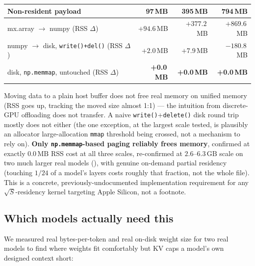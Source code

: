 \documentclass[11pt]{article}
\begin{document}
\begin{center}
\begin{tabular}{@{}lrrr@{}}
\toprule
Non-resident payload & 97\,MB & 395\,MB & 794\,MB \\
\midrule
mx.array $\to$ numpy (RSS $\Delta$) & $+94.6$\,MB & $+377.2$\,MB & $+869.6$\,MB \\
numpy $\to$ disk, \texttt{write()+del()} (RSS $\Delta$) & $+2.0$\,MB & $+7.9$\,MB & $-180.8$\,MB \\
disk, \texttt{np.memmap}, untouched (RSS $\Delta$) & \textbf{+0.0\,MB} & \textbf{+0.0\,MB} & \textbf{+0.0\,MB} \\
\bottomrule
\end{tabular}
\end{center}
Moving data to a plain host buffer does not free real memory on unified
memory (RSS goes up, tracking the moved size almost 1:1) --- the intuition
from discrete-GPU offloading does not transfer. A naive
\texttt{write()}+\texttt{delete()} disk round trip mostly does not either
(the one exception, at the largest scale tested, is plausibly an allocator
large-allocation \texttt{mmap} threshold being crossed, not a mechanism to
rely on). \textbf{Only \texttt{np.memmap}-based paging reliably frees
memory}, confirmed at exactly $0.0\,\mathrm{MB}$ RSS cost at all three
scales, re-confirmed at $2.6$--$6.3\,\mathrm{GB}$ scale on two much larger
real models (), with genuine on-demand partial
residency (touching $1/24$ of a model's layers costs roughly that
fraction, not the whole file). This is a concrete, previously-undocumented
implementation requirement for any $\sqrt{S}$-residency kernel targeting
Apple Silicon, not a footnote.

\subsection{Which models actually need this}
\label{sec:suitability}
We measured real bytes-per-token and real on-disk weight size for two
real models to find where weights fit comfortably but KV caps a model's
own designed context short:
\end{document}

